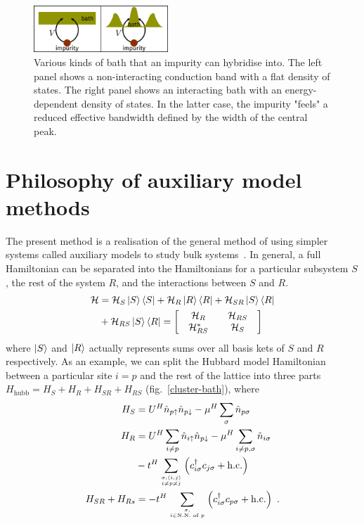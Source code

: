\documentclass[reprint,hidelinks,onecolumn]{revtex4-2}
\begin{document}
\begin{figure}[!htb]
\centering
\includegraphics[width=0.45\textwidth]{dos_diff.pdf}
\caption{Various kinds of bath that an impurity can hybridise into. The left panel shows a non-interacting conduction band with a flat density of states. The right panel shows an interacting bath with an energy-dependent density of states. In the latter case, the impurity "feels" a reduced effective bandwidth defined by the width of the central peak.}
\end{figure}

\section{Philosophy of auxiliary model methods}
The present method is a realisation of the general method of using simpler systems called auxiliary models to study bulk systems~\cite{martin_2016}. In general, a full Hamiltonian can be separated into the Hamiltonians for a particular subsystem \(S\), the rest of the system \(R\), and the interactions between \(S\) and \(R\).
\begin{equation}\begin{aligned}
	\mathcal{H} &= \mathcal{H}_S\ket{S}\bra{S} + \mathcal{H}_R \ket{R}\bra{R} + \mathcal{H}_{SR} \ket{S}\bra{R} \\
				&+ \mathcal{H}_{RS}\ket{S}\bra{R} = \begin{bmatrix} & \mathcal{H}_{R} && \mathcal{H}_{RS} & \\ & \mathcal{H}_{RS}^* && \mathcal{H}_{S} & \end{bmatrix}
\end{aligned}\end{equation}
where \(\ket{S}\) and \(\ket{R}\) actually represents sums over all basis kets of \(S\) and \(R\) respectively. As an example, we can split the Hubbard model Hamiltonian between a particular site \(i = p\) and the rest of the lattice into three parts \(H_\text{hubb} = H_S + H_R + H_{SR} + H_{RS}\) (fig.~\ref{cluster-bath}), where
\begin{equation}\begin{aligned}
	H_S &= U^H\hat n_{p \uparrow} \hat n_{p \downarrow} - \mu^H \sum_\sigma \hat n_{p \sigma}\\
	H_R &= U^H\sum_{i \neq p}\hat n_{i \uparrow} \hat n_{p \downarrow} - \mu^H \sum_{i \neq p, \sigma} \hat n_{i \sigma} \\
		&-t^H\sum_{\sigma,\left<i,j \right>\atop{i \neq p \neq j}}\left(c^\dagger_{i\sigma} c_{j\sigma} + \text{h.c.}\right) \\
	H_{SR} + H_{Rs} &= - t^H\sum_{\sigma,\atop{i \in \text{N.N. of }p}}\left(c^\dagger_{i\sigma} c_{p\sigma} + \text{h.c.}\right)~.
\end{aligned}\end{equation}
\end{document}

